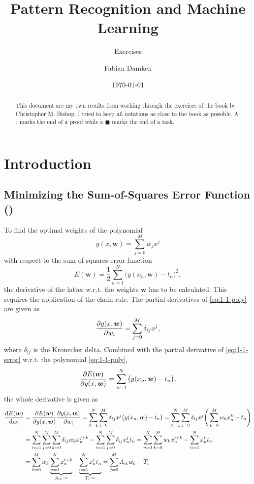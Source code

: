 \documentclass[11pt, a4paper]{scrartcl}
\title{Pattern Recognition and Machine Learning}
\subtitle{Exercises}
\author{Fabian Damken}
\date{\today}
\renewcommand{\vec}[1]{\bm{#1}}
\newcommand{\diffstar}{\texorpdfstring{\raisebox{-1pt}{\resizebox{!}{8pt}{\(\star\)}}}{*}}
\newcommand{\onestar}  {(\diffstar)}
\begin{document}
	\maketitle

	\begin{abstract}
		This document are my own results from working through the exercises of the book \emph{\@title} by Christopher M. Bishop. I tried to keep all notations as close to the book as possible. A \(\square\) marks the end of a proof while a \(\blacksquare\) marks the end of a task.
	\end{abstract}

	\section{Introduction}
		\subsection{Minimizing the Sum-of-Squares Error Function  \onestar}
			To find the optimal weights of the polynomial
			\begin{equation}
				y(x, \vec{w}) = \sum_{j = 0}^{M} w_j x^j  \label{eq:1-1-poly}
			\end{equation}
			with respect to the sum-of-squares error function
			\begin{equation}
				E(\vec{w}) = \frac{1}{2} \sum_{n = 1}^{N} \big( y(x_n, \vec{w}) - t_n \big)^2,  \label{eq:1-1-error}
			\end{equation}
			the derivative of the latter w.r.t. the weights \(\vec{w}\) has to be calculated. This requires the application of the chain rule. The partial derivatives of \eqref{eq:1-1-poly} are given as
			\begin{equation}
				\pdv{y(x, \vec{w})}{w_i} = \sum_{j = 0}^{M} \delta_{ij} x^j,
			\end{equation}
			where \( \delta_{ij} \) is the Kronecker delta. Combined with the partial derivative of \eqref{eq:1-1-error} w.r.t. the polynomial \eqref{eq:1-1-poly},
			\begin{equation}
				\pdv{E(\vec{w})}{y(x, \vec{w})} = \sum_{n = 1}^{N} \big( y(x_n, \vec{w}) - t_n \big),
			\end{equation}
			the whole derivative is given as
			\begin{align}
				\dv{E(\vec{w})}{w_i}
					&= \pdv{E(\vec{w})}{y(x, \vec{w})} \pdv{y(x, \vec{w})}{w_i}
					 = \sum_{n = 1}^{N} \sum_{j = 0}^{M} \delta_{ij} x^j \big( y(x_n, \vec{w}) - t_n \big)
					 = \sum_{n = 1}^{N} \sum_{j = 0}^{M} \delta_{ij} x^j \Bigg( \sum_{k = 0}^{M} w_k x_n^k - t_n \Bigg) \\
					&= \sum_{n = 1}^{N} \sum_{j = 0}^{M} \sum_{k = 0}^{M} \delta_{ij} w_k x_n^{j + k} - \sum_{n = 1}^{N} \sum_{j = 0}^{M} \delta_{ij} x_n^j t_n
					 = \sum_{n = 1}^{N} \sum_{k = 0}^{M} w_k x_n^{i + k} - \sum_{n = 1}^{N} x_n^i t_n \\
					&= \sum_{k = 0}^{M} w_k \underbrace{\sum_{n = 1}^{N} x_n^{i + k}}_{A_{ik} \,\coloneqq} - \underbrace{\sum_{n = 1}^{N} x_n^i t_n}_{T_i \,\coloneqq}
					 = \sum_{j = 0}^{M} A_{ik} w_k - T_i
			\end{align}
\end{document}
